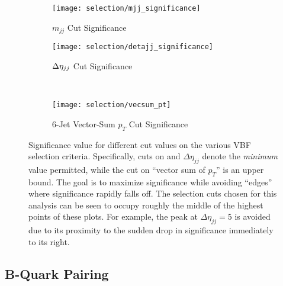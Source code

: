         \begin{figure}[tbh]
            \begin{subfigure}{0.48\textwidth}
                \texttt{[image: selection/mjj\_significance]}
                \caption{$m_{jj}$ Cut Significance}
            \end{subfigure}
            \begin{subfigure}{0.48\textwidth}
                \texttt{[image: selection/detajj\_significance]}
                \caption{$\Delta \eta_{jj}$ Cut Significance}
            \end{subfigure}\\
            \begin{subfigure}{0.48\textwidth}
                \texttt{[image: selection/vecsum\_pt]}
                \caption{6-Jet Vector-Sum $p_{T}$ Cut Significance}
            \end{subfigure}
            \caption{
                Significance value for different cut values on the various VBF selection criteria\cite{vbf_hh_4b_2018_int}.
                Specifically, cuts on \mjj and $\Delta \eta_{jj}$ denote the \textit{minimum} value permitted,
                    while the cut on ``vector sum of $p_T$'' is an upper bound.
                The goal is to maximize significance while avoiding ``edges'' where significance rapidly falls off.
                The selection cuts chosen for this analysis can be seen to occupy roughly the middle
                    of the highest points of these plots.
                For example, the peak at $\Delta \eta_{jj} = 5$ is avoided due to its proximity
                    to the sudden drop in significance immediately to its right.
            }
            \label{fig:vbf_cuts}
        \end{figure}


    \subsection{B-Quark Pairing}

